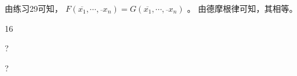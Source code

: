 {{        %
        \begin{practices}
            由练习29可知， $F(\overline{x_1}, \cdots, \overline{}{x_n}) = G(\overline{x_1}, \cdots, \overline{}{x_n})$ 。
            由德摩根律可知，其相等。
        \end{practices}

        \begin{practices}
            16
        \end{practices}

        \begin{practices}
            ?
        \end{practices}

        \begin{practices}

        \end{practices}

        \begin{practices}

        \end{practices}

        \begin{practices}

        \end{practices}

        \begin{practices}

        \end{practices}

        \begin{practices}

        \end{practices}

        \begin{practices}

        \end{practices}

        \begin{practices}

        \end{practices}

        \begin{practices}

        \end{practices}

        \begin{practices}

        \end{practices}

        \begin{practices}

        \end{practices}

        \begin{practices}
            ?
        \end{practices}
    }
}
